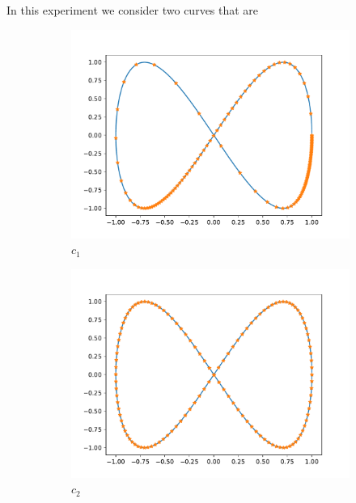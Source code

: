 In this experiment we consider two curves that are
\begin{figure}[t]\label{fig:curve_1}
    \begin{subfigure}[b]{0.5\textwidth}\label{fig:curve_1_c_1}
        \centering
        \includegraphics[width=\linewidth]{figures/curve_1/curve_c_1.pdf}
        \caption{\(c_1\)}
    \end{subfigure}
    \begin{subfigure}[b]{0.5\textwidth}\label{fig:curve_1_c_2}
        \centering
        \includegraphics[width=\linewidth]{figures/curve_1/curve_c_2.pdf}
        \caption{\(c_2\)}
    \end{subfigure}
    \begin{subfigure}[t]{0.5\textwidth}\label{fig:curve_1_q}

\end{subfigure}
\end{figure}
